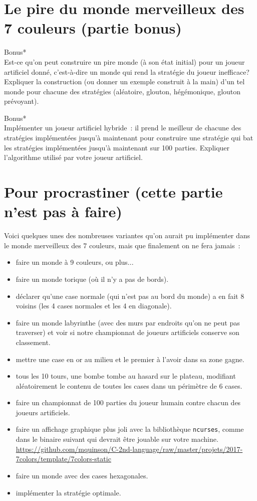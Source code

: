 \documentclass[a4paper,10pt]{article}
\begin{document}
\section{Le pire du monde merveilleux des 7 couleurs (partie bonus)}

\Question Bonus*\\
Est-ce qu'on peut construire un pire monde (à son état initial) pour un joueur artificiel donné, c'est-à-dire un monde qui rend la stratégie du joueur inefficace?
Expliquer la construction (ou donner un exemple construit à la main) d'un tel monde pour chacune des stratégies (aléatoire, glouton, hégémonique, glouton prévoyant).

\Question Bonus*\\
Implémenter un joueur artificiel hybride~: il prend le meilleur de chacune des stratégies implémentées jusqu'à maintenant pour construire une stratégie qui bat les stratégies implémentées jusqu'à maintenant sur 100 parties. Expliquer l'algorithme utilisé par votre joueur artificiel.


\section{Pour procrastiner (cette partie n'est pas à faire)}

Voici quelques unes des nombreuses variantes qu'on aurait pu implémenter dans le monde merveilleux des 7 couleurs, mais que finalement on ne fera jamais~:
\begin{itemize}
\item faire un monde à 9 couleurs, ou plus...
\item faire un monde torique (où il n'y a pas de bords).
\item déclarer qu'une case normale (qui n'est pas au bord du monde) a en fait 8 voisins (les 4 cases normales et les 4 en diagonale).
\item faire un monde labyrinthe (avec des murs par endroits qu'on ne peut pas traverser) et voir si notre championnat de joueurs artificiels conserve son classement.
\item mettre une case en or au milieu et le premier à l'avoir dans sa zone gagne.
\item tous les 10 tours, une bombe tombe au hasard sur le plateau,
  modifiant aléatoirement le contenu de toutes les cases dans un
  périmètre de 6 cases.
\item faire un championnat de 100 parties du joueur humain contre chacun des joueurs artificiels.
\item faire un affichage graphique plus joli avec la bibliothèque
  \texttt{ncurses}, comme dans le binaire suivant qui devrait être
  jouable sur votre machine.
  \url{https://github.com/mquinson/C-2nd-language/raw/master/projets/2017-7colors/template/7colors-static}
\item faire un monde avec des cases hexagonales.
\item implémenter la stratégie optimale.
\end{itemize}
\end{document}
